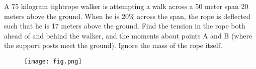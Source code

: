 
A 75 kilogram tightrope walker is attempting a walk across a 50 meter span 20 meters above the ground. When
he is 20\% across the span, the rope is deflected such that he is 17 meters above the ground. Find the tension
in the rope both ahead of and behind the walker, and the moments about points A and B (where the support
posts meet the ground). Ignore the mass of the rope itself.


\begin{figure}[ht!]
  \centering
  \texttt{[image: fig.png]}
\end{figure}

\iftoggle{flagSoln}{%
\vspace{.5cm}
\rule{\textwidth}{.4pt}
\vspace{.5cm}
\textbf{Solution:}
\begin{figure}[ht!]
  \centering
  \texttt{[image: soln.png]}
\end{figure}
}{%
}%
